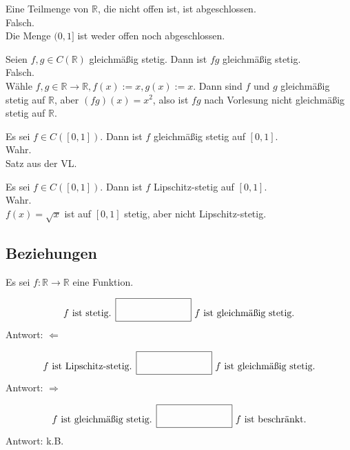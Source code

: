 Eine Teilmenge von $\mathbb{R}$, die nicht offen ist, ist abgeschlossen.\\
Falsch.\\
Die Menge $(0,1]$ ist weder offen noch abgeschlossen.

Seien $f,g \in C(\mathbb{R})$ gleichmäßig stetig.
Dann ist $fg$ gleichmäßig stetig.\\
Falsch.\\
Wähle  $f,g \in \mathbb{R} \to \mathbb{R}, f(x) := x, g(x) := x$.
Dann sind $f$ und $g$ gleichmäßig stetig auf $\mathbb{R}$, aber $(fg)(x) = x^2$, also ist $fg$ nach Vorlesung nicht gleichmäßig stetig auf $\mathbb{R}$.

Es sei $f \in C([0,1])$. Dann ist $f$ gleichmäßig stetig auf $[0,1]$.\\
Wahr.\\
Satz aus der VL.

Es sei $f \in C([0,1])$. Dann ist $f$ Lipschitz-stetig auf $[0,1]$.\\
Wahr.\\
$f(x) = \sqrt{x}$ ist auf $[0,1]$ stetig, aber nicht Lipschitz-stetig.

\subsection{Beziehungen}
Es sei $f : \mathbb{R} \to \mathbb{R}$ eine Funktion.

\begin{displaymath}
  f \text{ ist stetig. } \fbox{\rule{1in}{0pt}\rule[-0.5ex]{0pt}{4ex}} \text{ } f \text{ ist gleichmäßig stetig.}
\end{displaymath}
Antwort: $\Leftarrow$

\begin{displaymath}
  f \text{ ist Lipschitz-stetig. } \fbox{\rule{1in}{0pt}\rule[-0.5ex]{0pt}{4ex}} \text{ } f \text{ ist gleichmäßig stetig.}
\end{displaymath}
Antwort: $\Rightarrow$

\begin{displaymath}
  f \text{ ist gleichmäßig stetig. } \fbox{\rule{1in}{0pt}\rule[-0.5ex]{0pt}{4ex}} \text{ } f \text{ ist beschränkt.}
\end{displaymath}
Antwort: k.B.
